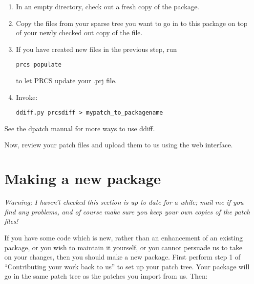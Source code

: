 \documentclass[a4paper]{article}
\begin{document}
\begin{enumerate}

\item In an empty directory, check out a fresh copy of the package.

\item Copy the files from your sparse tree you want to go in to this
package on top of your newly checked out copy of the file.

\item If you have created new files in the previous step, run
\begin{verbatim}
prcs populate
\end{verbatim}
to let PRCS update your .prj file.

\item Invoke:

\begin{verbatim}
ddiff.py prcsdiff > mypatch_to_packagename

\end{verbatim}

\end{enumerate}

See the dpatch manual for more ways to use ddiff.

Now, review your patch files and upload them to us using the web interface.


\section{Making a new package}
\emph{
Warning; I haven't checked this section is up to date for a while;
mail me if you find any problems, and of course make sure you keep
your own copies of the patch files!
}

If you have some code which is new, rather than an enhancement of an
existing package, or you wish to maintain it yourself, or you cannot
persuade us to take on your changes, then you should make a new
package. First perform step 1 of ``Contributing your work back to
us'' to set up your patch tree. Your package will go in the same patch
tree as the patches you import from us. Then:
\end{document}

